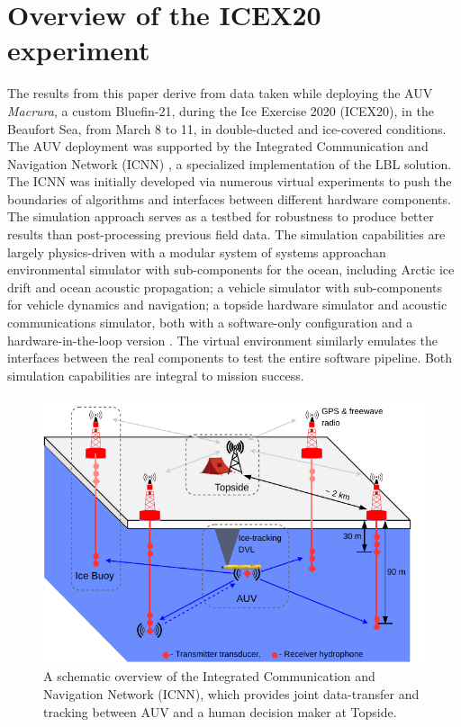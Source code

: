 \clearpage
\section{Overview of the ICEX20 experiment}\label{sec:icex20}

The results from this paper derive from data taken while deploying the AUV \emph{Macrura}, a custom Bluefin-21, during the Ice Exercise 2020 (ICEX20), in the Beaufort Sea, from March 8 to 11, in double-ducted and ice-covered conditions.
The AUV deployment was supported by the Integrated Communication and Navigation Network (ICNN) \citep{Schneider2020,Randeni2020,randeni_high-resolution_2021}, a specialized implementation of the LBL solution.
The ICNN was initially developed via numerous virtual experiments to push the boundaries of algorithms and interfaces between different hardware components.
The simulation approach serves as a testbed for robustness to produce better results than post-processing previous field data.
The simulation capabilities are largely physics-driven with a modular system of systems approach\textemdash an environmental simulator with sub-components for the ocean, including Arctic ice drift and ocean acoustic propagation; a vehicle simulator with sub-components for vehicle dynamics and navigation; a topside hardware simulator and acoustic communications simulator, both with a software-only configuration and a hardware-in-the-loop version \citep{Schneider2018}.
The virtual environment similarly emulates the interfaces between the real components to test the entire software pipeline.
Both simulation capabilities are integral to mission success.

\begin{figure}[h!]
	\centering
	\includegraphics[width=\reprintcolumnwidth]{figs/Fig2.pdf}
	\caption{A schematic overview of the Integrated Communication and Navigation Network (ICNN), which provides joint data-transfer and tracking between AUV and a human decision maker at Topside.}
	\label{fig:icnnOverview}
\end{figure}

